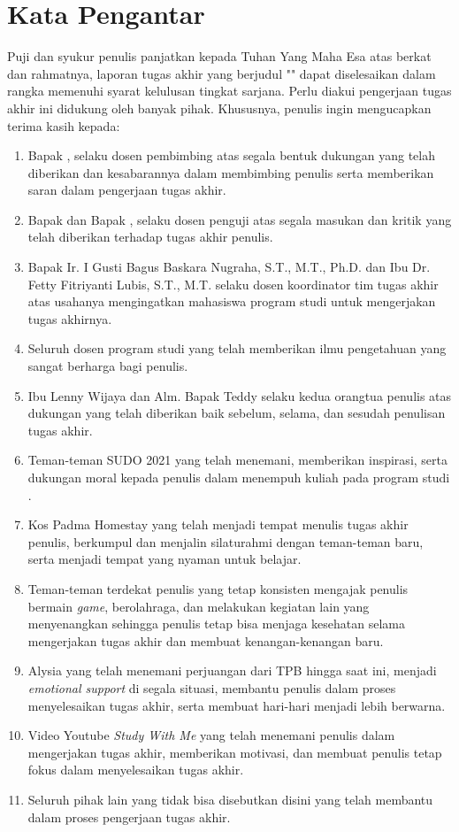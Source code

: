 \chapter*{Kata Pengantar}

Puji dan syukur penulis panjatkan kepada Tuhan Yang Maha Esa atas berkat dan rahmatnya, laporan tugas akhir yang berjudul "\thetitle" dapat diselesaikan dalam rangka memenuhi syarat kelulusan tingkat sarjana. Perlu diakui pengerjaan tugas akhir ini didukung oleh banyak pihak. Khususnya, penulis ingin mengucapkan terima kasih kepada:

\begin{enumerate}
	\item Bapak \namadosbingfull, selaku dosen pembimbing atas segala bentuk dukungan yang telah diberikan dan kesabarannya dalam membimbing penulis serta memberikan saran dalam pengerjaan tugas akhir.
	\item Bapak \namadosenpengsatufull{} dan Bapak \namadospengduafull, selaku dosen penguji atas segala masukan dan kritik yang telah diberikan terhadap tugas akhir penulis.
	\item Bapak Ir. I Gusti Bagus Baskara Nugraha, S.T., M.T., Ph.D. dan Ibu Dr. Fetty Fitriyanti Lubis, S.T., M.T.  selaku dosen koordinator tim tugas akhir atas usahanya mengingatkan mahasiswa program studi \stifull{} untuk mengerjakan tugas akhirnya.
	\item Seluruh dosen program studi \stifull{} \itb{} yang telah memberikan ilmu pengetahuan yang sangat berharga bagi penulis.
	\item Ibu Lenny Wijaya dan Alm. Bapak Teddy selaku kedua orangtua penulis atas dukungan yang telah diberikan baik sebelum, selama, dan sesudah penulisan tugas akhir.
	\item Teman-teman SUDO 2021 yang telah menemani, memberikan inspirasi, serta dukungan moral kepada penulis dalam menempuh kuliah pada program studi \stifull.
	\item Kos Padma Homestay yang telah menjadi tempat menulis tugas akhir penulis, berkumpul dan menjalin silaturahmi dengan teman-teman baru, serta menjadi tempat yang nyaman untuk belajar.
	\item Teman-teman terdekat penulis yang tetap konsisten mengajak penulis bermain \textit{game}, berolahraga, dan melakukan kegiatan lain yang menyenangkan sehingga penulis tetap bisa menjaga kesehatan selama mengerjakan tugas akhir dan membuat kenangan-kenangan baru.
	\item Alysia yang telah menemani perjuangan dari TPB hingga saat ini, menjadi \textit{emotional support} di segala situasi, membantu penulis dalam proses menyelesaikan tugas akhir, serta membuat hari-hari menjadi lebih berwarna.
	\item Video Youtube \textit{Study With Me} yang telah menemani penulis dalam mengerjakan tugas akhir, memberikan motivasi, dan membuat penulis tetap fokus dalam menyelesaikan tugas akhir.
	\item Seluruh pihak lain yang tidak bisa disebutkan disini yang telah membantu dalam proses pengerjaan tugas akhir.
\end{enumerate}

